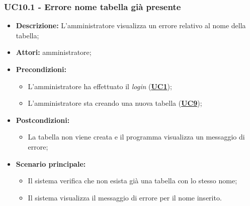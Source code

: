 \subsubsection{UC10.1 - Errore nome tabella già presente}
\label{sec:UC10.1}
\begin{itemize}
	\item \textbf{Descrizione:} L’amministratore visualizza un errore relativo al nome della tabella;
	\item \textbf{Attori:} amministratore;
	\item \textbf{Precondizioni:} 
	\begin{itemize}
		\item L’amministratore ha effettuato il \textit{login} (\hyperref[sec:UC1]{\textbf{UC1}});
		\item L’amministratore sta creando una nuova tabella (\hyperref[sec:UC9]{\textbf{UC9}});
	\end{itemize}
	\item \textbf{Postcondizioni:} 
	\begin{itemize}
		\item La tabella non viene creata e il programma visualizza un messaggio di errore;
	\end{itemize}
	\item \textbf{Scenario principale:} 
	\begin{itemize}
		\item Il sistema verifica che non esista già una tabella con lo stesso nome;
		\item Il sistema visualizza il messaggio di errore per il nome inserito.
	\end{itemize}
\end{itemize}

